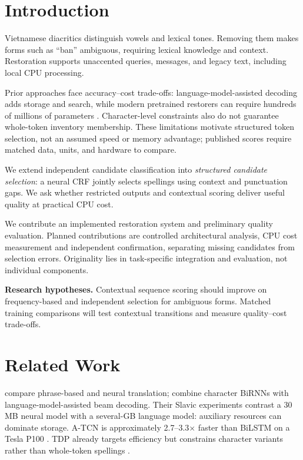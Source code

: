 \documentclass{article}
\begin{document}
\section{Introduction}
Vietnamese diacritics distinguish vowels and lexical tones. Removing them makes forms such as ``ban'' ambiguous, requiring lexical knowledge and context. Restoration supports unaccented queries, messages, and legacy text, including local CPU processing.

Prior approaches face accuracy--cost trade-offs: language-model-assisted decoding adds storage and search, while modern pretrained restorers can require hundreds of millions of parameters \citep{naplava2018,nom2026}. Character-level constraints also do not guarantee whole-token inventory membership. These limitations motivate structured token selection, not an assumed speed or memory advantage; published scores require matched data, units, and hardware to compare.

We extend independent candidate classification into \emph{structured candidate selection}: a neural CRF jointly selects spellings using context and punctuation gaps. We ask whether restricted outputs and contextual scoring deliver useful quality at practical CPU cost.

We contribute an implemented restoration system and preliminary quality evaluation. Planned contributions are controlled architectural analysis, CPU cost measurement and independent confirmation, separating missing candidates from selection errors. Originality lies in task-specific integration and evaluation, not individual components.

\textbf{Research hypotheses.} Contextual sequence scoring should improve on frequency-based and independent selection for ambiguous forms. Matched training comparisons will test contextual transitions and measure quality--cost trade-offs.

\section{Related Work}
\citet{pham2017} compare phrase-based and neural translation; \citet{naplava2018} combine character BiRNNs with language-model-assisted beam decoding. Their Slavic experiments contrast a 30 MB neural model with a several-GB language model: auxiliary resources can dominate storage. A-TCN is approximately 2.7--3.3$\times$ faster than BiLSTM on a Tesla P100 \citep{alqahtani2019}. TDP already targets efficiency but constrains character variants rather than whole-token spellings \citep{dang2020}.
\end{document}
